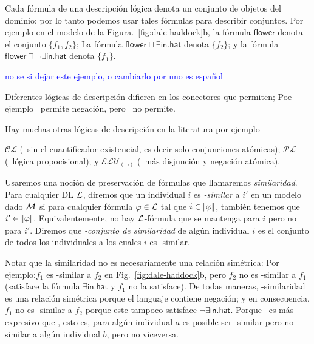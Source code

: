 Cada f\'ormula de una descripci\'on l\'ogica denota un conjunto de objetos del dominio; por lo tanto podemos usar tales f\'ormulas para describir conjuntos. Por ejemplo en el modelo de la Figura.~\ref{fig:dale-haddock}b, la f\'ormula
$\mathsf{flower}$ denota el conjunto $\{f_1,f_2\}$; La f\'ormula
$\mathsf{flower} \sqcap \exists \mathsf{in}.\mathsf{hat}$ denota
$\{f_2\}$; y la f\'ormula $\mathsf{flower} \sqcap \neg
\exists \mathsf{in}.\mathsf{hat}$ denota $\{f_1\}$.

\textcolor{blue}{no se si dejar este ejemplo, o cambiarlo por uno es espa\~nol}

Diferentes l\'ogicas de descripci\'on difieren en los conectores que permiten; Poe ejemplo \alc\ permite negaci\'on, pero \el\
no permite. 

Hay muchas otras l\'ogicas de descripci\'on en la literatura por ejemplo 

$\mathcal{CL}$ (\el\ sin el cuantificador existencial, es decir solo conjunciones at\'omicas); $\mathcal{PL}$ (\alc\ l\'ogica propocisional); y
$\mathcal{ELU}_{(\neg)}$ (\el\ m\'as disjunci\'on y negaci\'on at\'omica).

Usaremos una noci\'on de preservaci\'on de f\'ormulas que llamaremos
\emph{similaridad}. Para cualquier DL $\mathcal{L}$, diremos que un individual $i$ es \emph{\gL-similar} a $i'$ en un modelo dado $\mathcal{M}$
si para cualquier f\'ormula $\varphi \in \mathcal{L}$ tal que $i \in
|\!|\varphi|\!|$, tambi\'en tenemos que $i' \in |\!|\varphi|\!|$.
Equivalentemente, no hay $\mathcal{L}$-f\'ormula que se mantenga para $i$ pero no para
$i'$.  Diremos que \emph{\gL-conjunto de similaridad } de alg\'un individual
$i$ es el conjunto de todos los individuales a los cuales $i$ es \gL-similar.

Notar que la similaridad no es necesariamente una relaci\'on sim\'etrica: Por ejemplo:$f_1$ es \el-similar a $f_2$ en
Fig.~\ref{fig:dale-haddock}b, pero $f_2$ no es \el-similar a $f_1$
(satisface la f\'ormula $\exists \mathsf{in}.\mathsf{hat}$ y $f_1$
no la satisface).  De todas maneras, \alc-similaridad es una relaci\'on sim\'etrica porque
el languaje contiene negaci\'on; y en consecuencia, $f_1$ no es \alc-similar
a $f_2$ porque este tampoco satisface $\neg \exists
\mathsf{in}.\mathsf{hat}$.  Porque \alc\ es m\'as expresivo que \el,
esto es, para alg\'un individual $a$ es posible ser \el-similar pero
no \alc-similar a alg\'un individual $b$, pero no viceversa.



